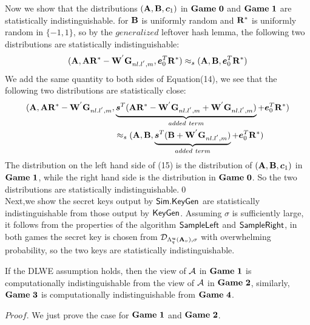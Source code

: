 Now we show that the distributions $(\mathbf{A}, \mathbf{B},\boldsymbol{c}_{1})$ in $\mathbf{Game\ 0}$ and $\mat{Game\ 1}$ are statistically indistinguishable. for $\mathbf{B}$ is uniformly random and $\mathbf{R}^{*}$ is uniformly random in $\{-1,1\}$, so by the $generalized$ leftover hash lemma, the following two distributions are statistically indistinguishable:
\begin{equation}
(\mathbf{A},\mathbf{A}\mathbf{R}^{*}-\mathbf{W}^{'}\mathbf{G}_{nl.l^{'},m}, \boldsymbol{e}^{T}_{0}\mathbf{R}^{*})\approx_{s}(\mathbf{A,B},\boldsymbol{e}^{T}_{0}\mathbf{R}^{*})
\end{equation}
We add the same quantity to both sides of Equation(14), we see that the following two distributions are statistically close:
\begin{equation}
\begin{split}
(\mat{A},\mat{A}\mat{R}^{*}-\mat{W}^{'}\G_{nl.l^{'},m},& \underbrace{\vec{s}^{T}(\mat{A}\mat{R}^{*}-\mat{W}^{'}\G_{nl.l^{'},m}+\mat{W}^{'}\G_{nl.l^{'},m})}
_{added\ term}+\vec{e}^{T}_{0}\mat{R}^{*})\\
&\approx_{s}(\mat{A,B},\underbrace{\vec{s}^{T}(\mat{B}+\mat{W}^{'}\G_{nl.l^{'},m})}_{added\ term}+\vec{e}^{T}_{0}\mat{R}^{*})\\
\end{split}
\end{equation}
The distribution on the left hand side of (15) is the distribution of $(\mathbf{A,B},\boldsymbol{c}_{1})$ in $\mat{Game\ 1}$, while the right hand side is the distribution in $\mathbf{Game\ 0}$. So the two distributions are statistically indistinguishable.\qed \\[0.2cm]

Next,we show the secret keys output by $\mathsf{Sim}.\mathsf{KeyGen}$ are statistically indistinguishable from those output by $\mathsf{KeyGen}$. Assuming $\sigma$ is sufficiently large, it follows from the properties of the algorithm $\mathsf{SampleLeft}$ and $\mathsf{SampleRight}$,  in both games the secret key is chosen from $\mathcal{D}_{\Lambda^{\boldsymbol{u}}_{q}(\mathbf{A}_{v}),\sigma}$ with overwhelming probability, so the two keys are statistically indistinguishable.
\begin{lemma}
If the DLWE assumption holds, then the view of $\mathcal{A}$ in $\mat{Game\ 1}$ is computationally indistinguishable from the view of $\mathcal{A}$ in $\mat{Game\ 2}$, similarly, $\mathbf{Game\ 3}$ is computationally indistinguishable from $\mathbf{Game\ 4}$.
\end{lemma}
\noindent $Proof$. We just prove the case for $\mat{Game\ 1}$ and $\mat{Game\ 2}$.\

